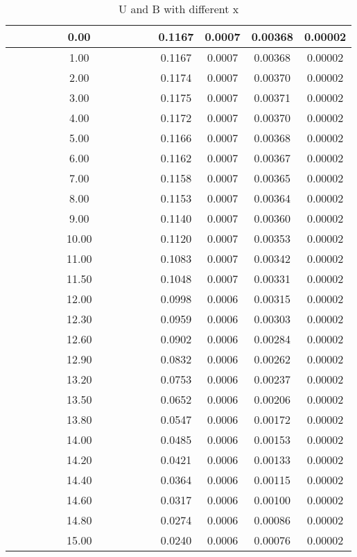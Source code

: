 \documentclass[12pt,a4paper]{article}
\begin{document}
\begin{table}[H]
    \centering
    \begin{tabular}{|c|c|c|c|c|}
    \hline
    0.00   & 0.1167 & 0.0007 & 0.00368 & 0.00002 \\ \hline
    1.00   & 0.1167 & 0.0007 & 0.00368 & 0.00002 \\ \hline
    2.00   & 0.1174 & 0.0007 & 0.00370 & 0.00002 \\ \hline
    3.00   & 0.1175 & 0.0007 & 0.00371 & 0.00002 \\ \hline
    4.00   & 0.1172 & 0.0007 & 0.00370 & 0.00002 \\ \hline
    5.00   & 0.1166 & 0.0007 & 0.00368 & 0.00002 \\ \hline
    6.00   & 0.1162 & 0.0007 & 0.00367 & 0.00002 \\ \hline
    7.00   & 0.1158 & 0.0007 & 0.00365 & 0.00002 \\ \hline
    8.00   & 0.1153 & 0.0007 & 0.00364 & 0.00002 \\ \hline
    9.00   & 0.1140 & 0.0007 & 0.00360 & 0.00002 \\ \hline
    10.00  & 0.1120 & 0.0007 & 0.00353 & 0.00002 \\ \hline
    11.00  & 0.1083 & 0.0007 & 0.00342 & 0.00002 \\ \hline
    11.50  & 0.1048 & 0.0007 & 0.00331 & 0.00002 \\ \hline
    12.00  & 0.0998 & 0.0006 & 0.00315 & 0.00002 \\ \hline
    12.30  & 0.0959 & 0.0006 & 0.00303 & 0.00002 \\ \hline
    12.60  & 0.0902 & 0.0006 & 0.00284 & 0.00002 \\ \hline
    12.90  & 0.0832 & 0.0006 & 0.00262 & 0.00002 \\ \hline
    13.20  & 0.0753 & 0.0006 & 0.00237 & 0.00002 \\ \hline
    ~~~~~~~~~~13.50~~~~~~~~~~  & 0.0652 & 0.0006 & 0.00206 & 0.00002 \\ \hline
    13.80  & 0.0547 & 0.0006 & 0.00172 & 0.00002 \\ \hline
    14.00  & 0.0485 & 0.0006 & 0.00153 & 0.00002 \\ \hline
    14.20  & 0.0421 & 0.0006 & 0.00133 & 0.00002 \\ \hline
    14.40  & 0.0364 & 0.0006 & 0.00115 & 0.00002 \\ \hline
    14.60  & 0.0317 & 0.0006 & 0.00100 & 0.00002 \\ \hline
    14.80  & 0.0274 & 0.0006 & 0.00086 & 0.00002 \\ \hline
    15.00  & 0.0240 & 0.0006 & 0.00076 & 0.00002 \\ \hline
    \end{tabular}
    \caption{U and B with different x}
    \label{ubi}
\end{table}
\end{document}
